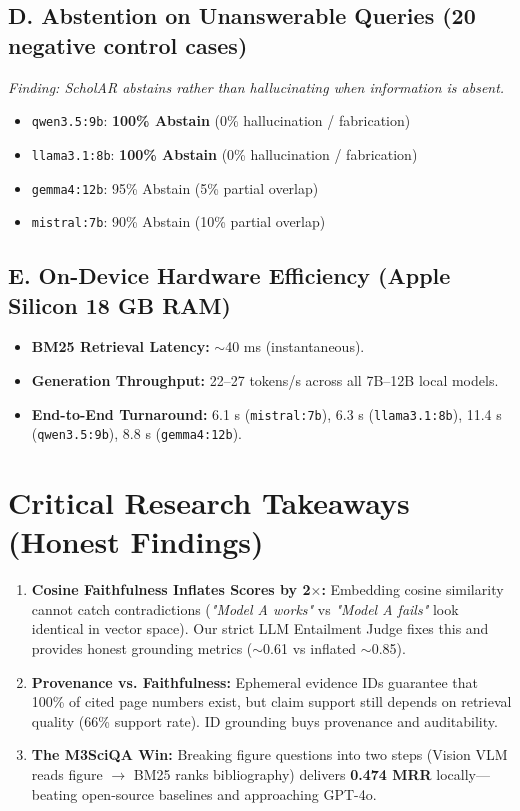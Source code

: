 \documentclass[10pt,a4paper]{article}
\begin{document}
\subsection{D. Abstention on Unanswerable Queries (20 negative control cases)}
\textit{Finding: ScholAR abstains rather than hallucinating when information is absent.}
\begin{itemize}[leftmargin=1.5em, itemsep=1pt]
    \item \texttt{qwen3.5:9b}: \textbf{100\% Abstain} (0\% hallucination / fabrication)
    \item \texttt{llama3.1:8b}: \textbf{100\% Abstain} (0\% hallucination / fabrication)
    \item \texttt{gemma4:12b}: 95\% Abstain (5\% partial overlap)
    \item \texttt{mistral:7b}: 90\% Abstain (10\% partial overlap)
\end{itemize}

\subsection{E. On-Device Hardware Efficiency (Apple Silicon 18 GB RAM)}
\begin{itemize}[leftmargin=1.5em, itemsep=1pt]
    \item \textbf{BM25 Retrieval Latency:} $\sim$40 ms (instantaneous).
    \item \textbf{Generation Throughput:} 22--27 tokens/s across all 7B--12B local models.
    \item \textbf{End-to-End Turnaround:} 6.1 s (\texttt{mistral:7b}), 6.3 s (\texttt{llama3.1:8b}), 11.4 s (\texttt{qwen3.5:9b}), 8.8 s (\texttt{gemma4:12b}).
\end{itemize}

\section{Critical Research Takeaways (Honest Findings)}

\begin{enumerate}[leftmargin=1.5em, itemsep=4pt]
    \item \textbf{Cosine Faithfulness Inflates Scores by 2$\times$:} Embedding cosine similarity cannot catch contradictions (\textit{"Model A works"} vs \textit{"Model A fails"} look identical in vector space). Our strict LLM Entailment Judge fixes this and provides honest grounding metrics ($\sim$0.61 vs inflated $\sim$0.85).
    \item \textbf{Provenance vs. Faithfulness:} Ephemeral evidence IDs guarantee that 100\% of cited page numbers exist, but claim support still depends on retrieval quality (66\% support rate). ID grounding buys provenance and auditability.
    \item \textbf{The M3SciQA Win:} Breaking figure questions into two steps (Vision VLM reads figure $\rightarrow$ BM25 ranks bibliography) delivers \textbf{0.474 MRR} locally—beating open-source baselines and approaching GPT-4o.
\end{enumerate}
\end{document}
